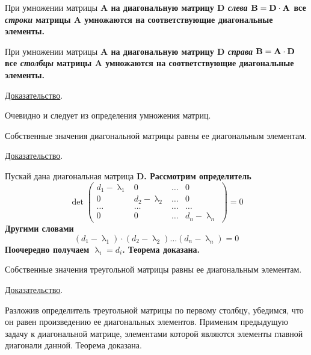 \begin{theorem}
    При умножении матрицы \bf{A} на диагональную матрицу \bf{D} \emph{слева} $\bf{B} = \bf{D} \cdot \bf{A}$ все \emph{строки}
    матрицы \bf{A} умножаются на соответствующие диагональные элементы.

    При умножении матрицы \bf{A} на диагональную матрицу \bf{D} \emph{справа} $\bf{B} = \bf{A} \cdot \bf{D}$ все
    \emph{столбцы} матрицы \bf{A} умножаются на соответствующие диагональные элементы.

    \underline{Доказательство}.
    \vspace{5pt}

    Очевидно и следует из определения умножения матриц.
\end{theorem}

\begin{theorem}
    Собственные значения диагональной матрицы равны ее диагональным элементам.

    \underline{Доказательство}.
    \vspace{5pt}

    Пускай дана диагональная матрица \bf{D}. Рассмотрим определитель
    \begin{equation*}
        \det
        \begin{pmatrix}
            d_1 - \uplambda_1 & 0                 & \dots & 0                 \\
            0                 & d_2 - \uplambda_2 & \dots & 0                 \\
            \dots             & \dots             & \dots & \dots             \\
            0                 & 0                 & \dots & d_n - \uplambda_n
        \end{pmatrix}
        = 0
    \end{equation*}
    Другими словами
    \begin{equation*}
        \left( d_1 - \uplambda_1 \right) \cdot \left( d_2 - \uplambda_2 \right) \dots \left( d_n - \uplambda_n \right) = 0
    \end{equation*}
    Поочередно получаем $\displaystyle \uplambda_i = d_i$. Теорема доказана.
\end{theorem}

\begin{theorem}
    Собственные значения треугольной матрицы равны ее диагональным элементам.

    \underline{Доказательство}.
    \vspace{5pt}

    Разложив определитель треугольной матрицы по первому столбцу, убедимся, что он равен произведению ее диагональных
    элементов. Применим предыдущую задачу к диагональной матрице, элементами которой являются элементы главной диагонали
    данной. Теорема доказана.
\end{theorem}

